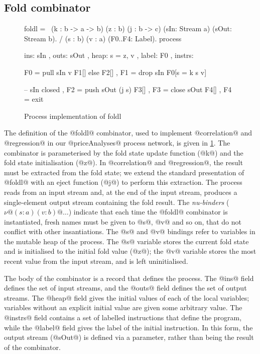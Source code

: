 \subsection{Fold combinator}
\begin{figure}
\begin{process}
foldl 
  = \ (k  : b -> a -> b) (z   : b) (j : b -> c)
      (sIn: Stream a)    (sOut: Stream b). 
    / (s  : b) (v : a)   (F0..F4: Label).
    process
     { ins:    { sIn  }
     , outs:   { sOut }
     , heap:   { s = z, v }
     , label:    F0
     , instrs: { F0 = pull  sIn     v  F1[] else F2[]
               , F1 = drop  sIn        F0[s = k s v]

               -- sIn closed
               , F2 = push  sOut (j s) F3[]
               , F3 = close sOut       F4[]
               , F4 = exit } }
\end{process}
\caption{Process implementation of foldl}
\label{figs/procs/impl/foldl}
\end{figure}

The definition of the @foldl@ combinator, used to implement @correlation@ and @regression@ in our @priceAnalyses@ process network, is given in \cref{figs/procs/impl/foldl}.
The combinator is parameterised by the fold state update function (@k@) and the fold state initialisation (@z@).
In @correlation@ and @regression@, the result must be extracted from the fold state; we extend the standard presentation of @foldl@ with an eject function (@j@) to perform this extraction.
The process reads from an input stream and, at the end of the input stream, produces a single-element output stream containing the fold result.
The \emph{nu-binders} ($\nu@ (s : a) (v : b)@\ldots$) indicate that each time the @foldl@ combinator is instantiated, fresh names must be given to @s@, @v@ and so on, that do not conflict with other insantiations.
The @s@ and @v@ bindings refer to variables in the mutable heap of the process.
The @s@ variable stores the current fold state and is initialised to the initial fold value (@z@); the @v@ variable stores the most recent value from the input stream, and is left uninitialised.

The body of the combinator is a record that defines the process.
The @ins@ field defines the set of input streams, and the @outs@ field defines the set of output streams.
The @heap@ field gives the initial values of each of the local variables; variables without an explicit initial value are given some arbitrary value.
The @instrs@ field contains a set of labelled instructions that define the program, while the @label@ field gives the label of the initial instruction.
In this form, the output stream (@sOut@) is defined via a parameter, rather than being the result of the combinator.

